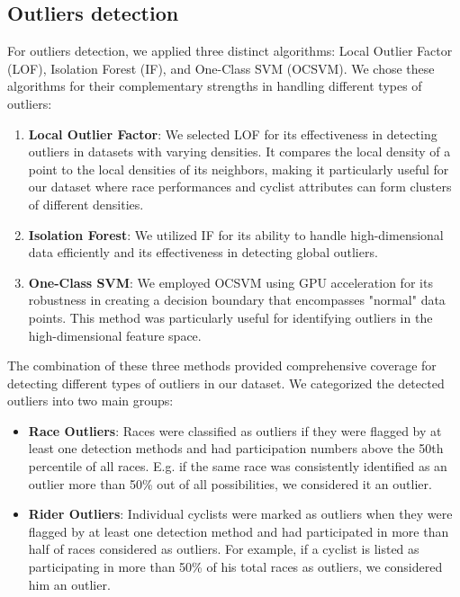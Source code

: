 \documentclass[a4paper, twoside]{article}
\begin{document}
\subsection{Outliers detection}
For outliers detection, we applied three distinct algorithms: Local Outlier Factor (LOF), Isolation Forest (IF), and One-Class SVM (OCSVM). We chose these algorithms for their complementary strengths in handling different types of outliers:
\begin{enumerate}[noitemsep]
    \item \textbf{Local Outlier Factor}: We selected LOF for its effectiveness in detecting outliers in datasets with varying densities. It compares the local density of a point to the local densities of its neighbors, making it particularly useful for our dataset where race performances and cyclist attributes can form clusters of different densities.
    
    \item \textbf{Isolation Forest}: We utilized IF for its ability to handle high-dimensional data efficiently and its effectiveness in detecting global outliers.
    
    \item \textbf{One-Class SVM}: We employed OCSVM using GPU acceleration for its robustness in creating a decision boundary that encompasses "normal" data points. This method was particularly useful for identifying outliers in the high-dimensional feature space.
\end{enumerate}
The combination of these three methods provided comprehensive coverage for detecting different types of outliers in our dataset. We categorized the detected outliers into two main groups:
\begin{itemize}[noitemsep]
    \item \textbf{Race Outliers}: Races were classified as outliers if they were flagged by at least one detection methods and had participation numbers above the 50th percentile of all races. E.g. if the same race was consistently identified as an outlier more than 50\% out of all possibilities, we considered it an outlier.

    \item \textbf{Rider Outliers}: Individual cyclists were marked as outliers when they were flagged by at least one detection method and had participated in more than half of races considered as outliers. For example, if a cyclist is listed as participating in more than 50\% of his total races as outliers, we considered him an outlier. 
\end{itemize}
\end{document}
